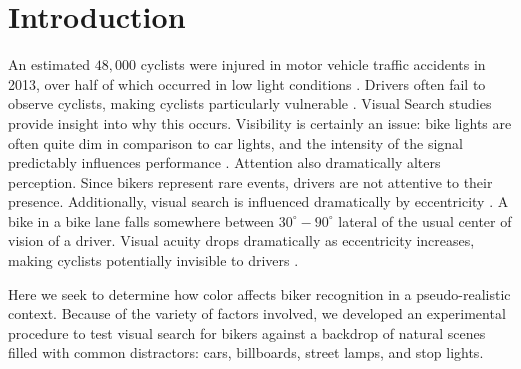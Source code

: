 \section{Introduction}



An estimated $48,000$ cyclists were injured in motor vehicle traffic accidents in
2013, over half of which occurred in low light conditions \cite{nhtsa2015}.
Drivers often fail to observe cyclists, making cyclists particularly vulnerable
\cite{wood2013bicyclists}. Visual Search studies provide insight into why this
occurs.  Visibility is certainly an issue: bike lights are often quite dim in
comparison to car lights, and the intensity of the signal predictably
influences performance \cite{engel1977visual}. Attention also dramatically
alters perception. Since bikers represent rare events, drivers are not
attentive to their presence.  Additionally, visual search is influenced
dramatically by eccentricity \cite{treisman1980feature}. A bike in a bike lane
falls somewhere between $30^\circ-90^\circ$ lateral of the usual center of
vision of a driver.  Visual acuity drops dramatically as eccentricity
increases, making cyclists potentially invisible to drivers
\cite{wolfe1998there}. 

Here we seek to determine how color affects biker recognition in a
pseudo-realistic context. Because of the variety of factors involved, we
developed an experimental procedure to test visual search for bikers against a
backdrop of natural scenes filled with common distractors: cars, billboards,
street lamps, and stop lights.
